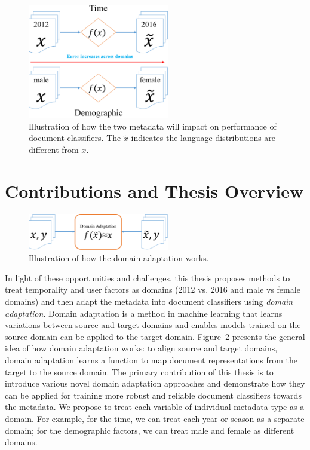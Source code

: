 \begin{figure}[htp]
\centering
\includegraphics[width=0.55\textwidth]{images/chapter1/metadata_impact.pdf}
\caption{Illustration of how the two metadata will impact on performance of document classifiers. The $\tilde{x}$ indicates the language distributions are different from $x$.}
\label{chap1:fig:impact}
\end{figure}

\section{Contributions and Thesis Overview}

\begin{figure}[htp]
\centering
\includegraphics[width=0.55\textwidth]{images/chapter1/da_illu.pdf}
\caption{Illustration of how the domain adaptation works.}
\label{chap1:fig:da}
\end{figure}


In light of these opportunities and challenges, this thesis proposes methods to treat temporality and user factors as domains (2012 vs. 2016 and male vs female domains) and then adapt the metadata into document classifiers using \textit{domain adaptation}.
Domain adaptation is a method in machine learning that learns variations between source and target domains and enables models trained on the source domain can be applied to the target domain. 
Figure~\ref{chap1:fig:da} presents the general idea of how domain adaptation works: to align source and target domains, domain adaptation learns a function to map document representations from the target to the source domain.
The primary contribution of this thesis is to introduce various novel domain adaptation approaches and demonstrate how they can be applied for training more robust and reliable document classifiers towards the metadata.
We propose to treat each variable of individual metadata type as a domain. For example, for the time, we can treat each year or season as a separate domain; for the demographic factors, we can treat male and female as different domains. 

